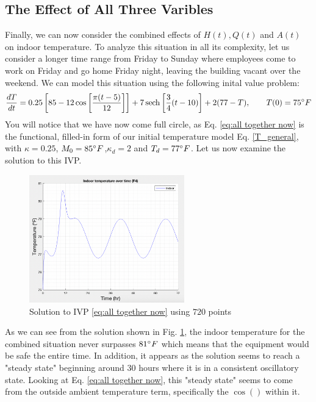 \documentclass[titlepage]{article}
\begin{document}
\subsection{The Effect of All Three Varibles}
Finally, we can now consider the combined effects of $H(t), Q(t)$
and $A(t)$ on indoor temperature. To analyze this situation in all
its complexity, let us consider a longer time range from Friday to Sunday
where employees come to work on Friday and go home Friday night,
leaving the building vacant over the weekend. We can model this situation using the following inital value problem:
\begin{equation}\label{eq:all together now}
    \frac{dT}{dt} = 0.25\left[85 - 12\cos\left[\frac{\pi(t-5)}{12}\right]\right] + 7\operatorname{sech}\left[\frac{3}{4}(t-10)\right] +  2(77-T), \qquad T(0)=75\degree F
\end{equation}
You will notice that we have now come full circle, as Eq. \eqref{eq:all together now} is the functional, filled-in form of our initial temperature model
Eq. \eqref{T_general}, with $\kappa=0.25$, $M_0=85\degree F$,$\kappa_d=2$ and $T_d=77\degree F$. Let us now examine the solution to this
IVP.
\begin{figure}[H]
    \centering
    \includegraphics[width=0.6\textwidth]{./images/allTogetherNow.png}
    \caption{Solution to IVP \eqref{eq:all together now} using $720$ points}
    \label{fig:all together now}
\end{figure}
As we can see from the solution shown in Fig. \ref{fig:all together now}, the indoor temperature for the combined situation
never surpasses $81\degree F$ which means that the equipment would be safe the entire time. In addition, it appears as 
the solution seems to reach a "steady state" beginning around $30$ hours where it is in a consistent oscillatory state.
Looking at Eq. \eqref{eq:all together now}, this "steady state" seems to come from the outside ambient temperature term, 
specifically the $\cos()$ within it.
\end{document}
